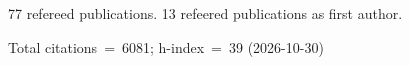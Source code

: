 77 refereed publications. 13 refeered publications as first author.

Total citations~=~6081; h-index~=~39 (2026-10-30)